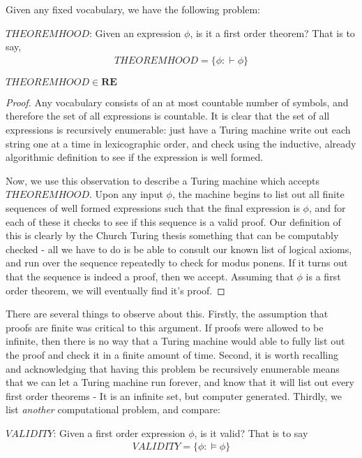 \begin{problem}
    Given any fixed vocabulary, we have the following problem:
    \begin{center}
        $THEOREMHOOD$: Given an expression $\phi$, is it a first order theorem? That is to say,
        \begin{align}
            THEOREMHOOD = \{\phi: \vdash \phi\} 
        \end{align}
    \end{center}
\end{problem}
\begin{fact}
    $THEOREMHOOD \in \textbf{RE}$
\end{fact}
\begin{proof}
    Any vocabulary consists of an at most countable number of symbols, and therefore the set of all expressions is countable. It is clear that the set of all expressions is recursively enumerable: just have a Turing machine write out each string one at a time in lexicographic order, and check using the inductive, already algorithmic definition to see if the expression is well formed. 
    \par Now, we use this observation to describe a Turing machine which accepts $THEOREMHOOD$. Upon any input $\phi$, the machine begins to list out all finite sequences of well formed expressions such that the final expression is $\phi$, and for each of these it checks to see if this sequence is a valid proof. Our definition of this is clearly by the Church Turing thesis something that can be computably checked - all we have to do is be able to consult our known list of logical axioms, and run over the sequence repeatedly to check for modus ponens. If it turns out that the sequence is indeed a proof, then we accept. Assuming that $\phi$ is a first order theorem, we will eventually find it's proof.
\end{proof}
There are several things to observe about this. Firstly, the assumption that proofs are finite was critical to this argument. If proofs were allowed to be infinite, then there is no way that a Turing machine would able to fully list out the proof and check it in a finite amount of time. Second, it is worth recalling and acknowledging that having this problem be recursively enumerable means that we can let a Turing machine run forever, and know that it will list out every first order theorems - It is an infinite set, but computer generated. Thirdly, we list \textit{another} computational problem, and compare:
\begin{problem}
    \begin{center}
        $VALIDITY$: Given a first order expression $\phi$, is it valid? That is to say
        \begin{align}
            VALIDITY = \{\phi: \models  \phi  \}
        \end{align}
    \end{center}
\end{problem}
